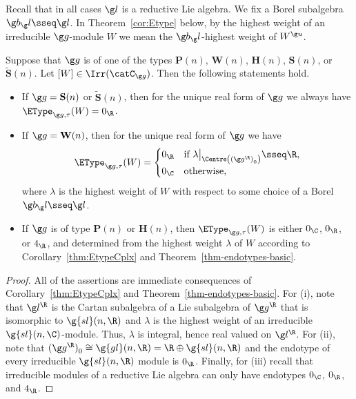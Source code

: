 \documentclass[12pt]{amsart}
\begin{document}
Recall that  in all cases $\g l$ is a reductive Lie algebra. 
We fix a Borel subalgebra $\g b_\g l\sseq \g l$. 
In Theorem~\ref{cor:Etype} below, by the  highest weight of an irreducible  $\g g$-module $W$ we mean  the $\g b_\g l$-highest weight of $W^{\g u}$. 
\begin{thm}
\label{cor:Etype}
Suppose that $\g g$ is of one of the types $\mathbf P(n)$, $\mathbf W(n)$, $\mathbf H(n)$,  $\mathbf S(n)$, or  $\tilde{\mathbf S}(n)$.  Let $[W]\in\Irr(\catC_{\g g})$. Then the following statements hold.
\begin{itemize}
\item[\rm (i)] If $\g g=\mathbf{S}(n)$ or $\tilde{\mathbf S}(n)$, then for the unique real form  of $\g g$ we always have $\EType_{\g g,\tau}(W)=0_\R$.  

\item[\rm (ii)] If  $\g g=\mathbf{W}(n)$, then for the unique real form of $\g g$ we have
\[
\EType_{\g g,\tau}(W)=\begin{cases}
0_\R & \text{if }\lambda\big|_{\Centre\left((\g g^\R)_0^{}\right)}\sseq \R,\\
0_\C&\text{otherwise,}
\end{cases}
\] 
where $\lambda$ is the highest weight of $W$ with respect to some choice of a Borel $\g b_\g l\sseq\g l$. 


\item[\rm (iii)] If $\g g$ is of type $\mathbf{P}(n)$ or $\mathbf{H}(n)$, then $\EType_{\g g,\tau}(W)$ is either $0_\C$, $0_\R$, or $4_\R$, and determined from the highest weight $\lambda$ of $W$ according to Corollary~\ref{thm:EtypeCplx} and Theorem~\ref{thm-endotypes-basic}.
\end{itemize}
\end{thm}

\begin{proof}
All of the assertions are immediate consequences of Corollary~\ref{thm:EtypeCplx} and Theorem~\ref{thm-endotypes-basic}. For (i), note that $\g l^\R$ is the Cartan subalgebra of a Lie subalgebra of $\g g^\R$ that is isomorphic to $\g{sl}(n,\R)$ and $\lambda$ is the highest weight of an irreducible $\g{sl}(n,\C)$-module. Thus,  $\lambda$ is integral, hence real valued on $\g l^\R$. For (ii), note that $(\g g^\R)_0^{}\cong \g{gl}(n,\R)=\R\oplus \g{sl}(n,\R)$ and the endotype of every 
irreducible $\g{sl}(n,\R)$ module is $0_\R$. Finally, for (iii) recall that  irreducible modules of a reductive Lie algebra can only have endotypes $0_\C$, $0_\R$, and $4_\R$. 
\end{proof}
\end{document}
